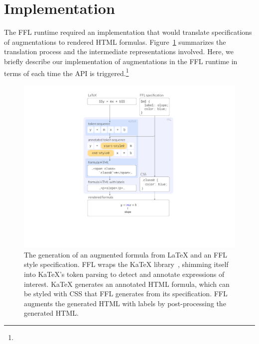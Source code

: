 \section{Implementation}\label{sec:impl}

The FFL runtime required an implementation that would translate specifications of augmentations to rendered HTML formulas. Figure~\ref{fig:dataflow} summarizes the translation process and the intermediate representations involved. Here, we briefly describe our implementation of augmentations in the FFL runtime in terms of each time the API is triggered.\footnote{}

\begin{figure}
    \centering
    \includegraphics[width=.86\columnwidth]{fig/dataflow} 
    \caption{The generation of an augmented formula from LaTeX and an FFL style specification. \normalfont FFL wraps the  KaTeX library~\cite{tool:katex}, shimming itself into KaTeX's token parsing to detect and annotate expressions of interest. KaTeX generates an annotated HTML formula, which can be styled with CSS that FFL generates from its specification. FFL augments the generated HTML with labels by post-processing the generated HTML.}
    \label{fig:dataflow}
\end{figure}

